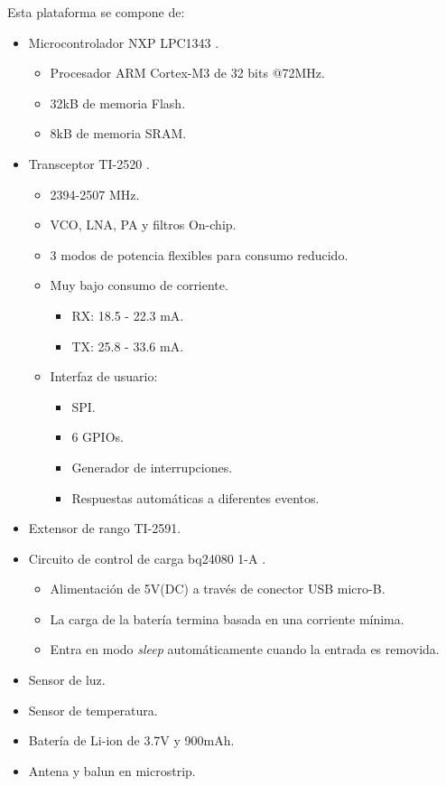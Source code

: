 \noindent Esta plataforma se compone de:
\begin{itemize}
\item Microcontrolador NXP LPC1343 \citep{1343}.
   \begin{itemize}
   \item Procesador ARM Cortex-M3 de 32 bits @72MHz. 
   \item 32kB de memoria Flash.
   \item 8kB de memoria SRAM.
   \end{itemize}
\item Transceptor TI-2520 \citep{2520}.
		\begin{itemize}
			\item 2394-2507 MHz.
			\item VCO, LNA, PA y filtros On-chip.
			\item 3 modos de potencia flexibles para consumo reducido.
			\item Muy bajo consumo de corriente.
			\begin{itemize}
				\item RX: 18.5 - 22.3 mA.
				\item TX: 25.8 - 33.6 mA.
			\end{itemize}
			\item Interfaz de usuario:
			\begin{itemize}
				\item SPI.
				\item 6 GPIOs.
 				\item Generador de interrupciones.
				\item Respuestas automáticas a diferentes eventos.
			\end{itemize}
		\end{itemize}
\item Extensor de rango TI-2591.
\item Circuito de control de carga bq24080 1-A \citep{bq}.
		\begin{itemize}
			\item Alimentación de 5V(DC) a través de conector USB micro-B.
			\item La carga de la batería termina basada en una corriente mínima.
			\item Entra en modo \textit{sleep} automáticamente cuando la entrada es removida.		
		\end{itemize}
\item Sensor de luz.
\item Sensor de temperatura.
\item Batería de Li-ion de 3.7V y 900mAh.
\item Antena y balun en microstrip.
\end{itemize}
 

